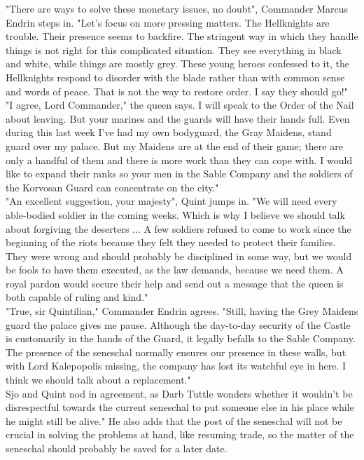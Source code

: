 "There are ways to solve these monetary issues, no doubt", Commander Marcus Endrin steps in. "Let's focus on more pressing matters. The Hellknights are trouble. Their presence seems to backfire. The stringent way in which they handle things is not right for this complicated situation. They see everything in black and white, while things are mostly grey. These young heroes confessed to it, the Hellknights respond to disorder with the blade rather than with common sense and words of peace. That is not the way to restore order. I say they should go!"\\

"I agree, Lord Commander," the queen says. I will speak to the Order of the Nail about leaving. But your marines and the guards will have their hands full. Even during this last week I've had my own bodyguard, the Gray Maidens, stand guard over my palace. But my Maidens are at the end of their game; there are only a handful of them and there is more work than they can cope with. I would like to expand their ranks so your men in the Sable Company and the soldiers of the Korvosan Guard can concentrate on the city."\\

"An excellent suggestion, your majesty", Quint jumps in. "We will need every able-bodied soldier in the coming weeks. Which is why I believe we should talk about forgiving the deserters ... A few soldiers refused to come to work since the beginning of the riots because they felt they needed to protect their families. They were wrong and should probably be disciplined in some way, but we would be fools to have them executed, as the law demands, because we need them. A royal pardon would secure their help and send out a message that the queen is both capable of ruling and kind."\\

"True, sir Quintilian," Commander Endrin agrees. "Still, having the Grey Maidens guard the palace gives me pause. Although the day-to-day security of the Castle is customarily in the hands of the Guard, it legally befalls to the Sable Company. The presence of the seneschal normally ensures our presence in these walls, but with Lord Kalepopolis missing, the company has lost its watchful eye in here. I think we should talk about a replacement."\\

Sjo and Quint nod in agreement, as Darb Tuttle wonders whether it wouldn't be disrespectful towards the current seneschal to put someone else in his place while he might still be alive." He also adds that the post of the seneschal will not be crucial in solving the problems at hand, like resuming trade, so the matter of the seneschal should probably be saved for a later date.\\

